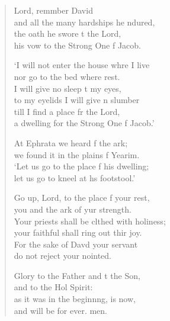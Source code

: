 \begin{verse}
  \begin{patverse}
 Lord, remmber David\Med\\
    and all the many hardships he ndured,\\
the oath he swore t the Lord,\Med\\
    his vow to the Strong One f Jacob.

‘I will not enter the house whre I live\Med\\
    nor go to the bed where  rest.\\
I will give no sleep t my eyes,\Med\\
    to my eyelids I will give n slumber\\
till I find a place fr the Lord,\Med\\
    a dwelling for the Strong One f Jacob.’

At Ephrata we heard f the ark;\Med\\
    we found it in the plains f Yearim.\\
‘Let us go to the place f his dwelling;\Med\\
    let us go to kneel at h\pointup{\i}s footstool.’

Go up, Lord, to the place f your rest,\Med\\
    you and the ark of yur strength.\\
Your priests shall be clthed with holiness;\Med\\
    your faithful shall ring out thir joy.\\
For the sake of Dav\pointup{\i}d your servant\Med\\
    do not reject your nointed.

Glory to the Father and t the Son,\Med\\
    and to the Hol Spirit:\\
as it was in the beginn\pointup{\i}ng, is now,\Med\\
    and will be for ever. men.
  \end{patverse}
\end{verse}
